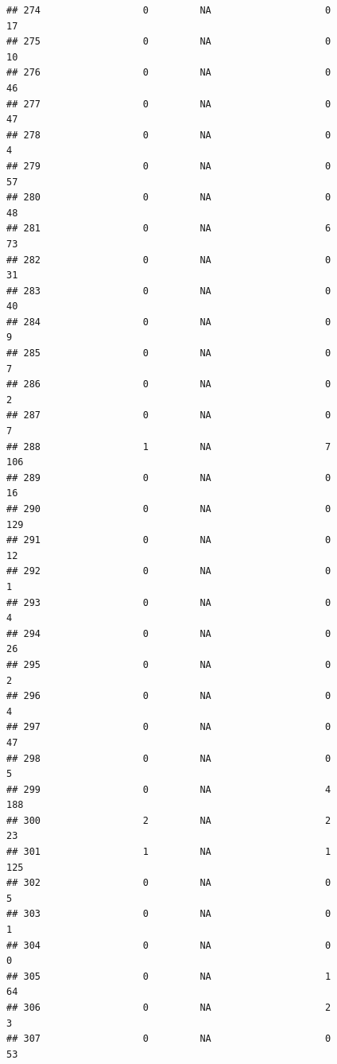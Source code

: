 \documentclass[
]{article}
\begin{document}
\begin{verbatim}
## 274                  0         NA                    0                 17
## 275                  0         NA                    0                 10
## 276                  0         NA                    0                 46
## 277                  0         NA                    0                 47
## 278                  0         NA                    0                  4
## 279                  0         NA                    0                 57
## 280                  0         NA                    0                 48
## 281                  0         NA                    6                 73
## 282                  0         NA                    0                 31
## 283                  0         NA                    0                 40
## 284                  0         NA                    0                  9
## 285                  0         NA                    0                  7
## 286                  0         NA                    0                  2
## 287                  0         NA                    0                  7
## 288                  1         NA                    7                106
## 289                  0         NA                    0                 16
## 290                  0         NA                    0                129
## 291                  0         NA                    0                 12
## 292                  0         NA                    0                  1
## 293                  0         NA                    0                  4
## 294                  0         NA                    0                 26
## 295                  0         NA                    0                  2
## 296                  0         NA                    0                  4
## 297                  0         NA                    0                 47
## 298                  0         NA                    0                  5
## 299                  0         NA                    4                188
## 300                  2         NA                    2                 23
## 301                  1         NA                    1                125
## 302                  0         NA                    0                  5
## 303                  0         NA                    0                  1
## 304                  0         NA                    0                  0
## 305                  0         NA                    1                 64
## 306                  0         NA                    2                  3
## 307                  0         NA                    0                 53

\end{verbatim}
\end{document}
